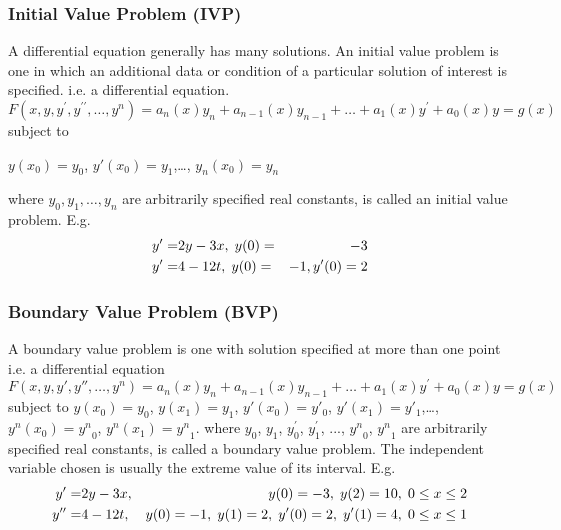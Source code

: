 \documentclass[12pt]{report}
\begin{document}
\subsubsection{Initial Value Problem (IVP)}
A differential equation generally has many solutions. An initial value problem is one in which an additional data or condition of a particular solution of interest is specified. i.e. a differential equation.
\begin{equation}
F(x,y,y^\prime,y^{\prime\prime},\dots,y^n ) = a_n(x)y_n + a_{n-1}(x)y_{n-1} + \dots + a_1(x)y^\prime + a_0(x)y = g(x)  
\end{equation}
subject to
\begin{center}
	$y(x_0) = y_0$, $y'(x_0) = y_1$,…, $y_n(x_0) = y_n$
\end{center}
where $y_0, y_1, \dots , y_n$ are arbitrarily specified real constants, is called an initial value problem. E.g.
\begin{eqnarray}
y' =& 2y - 3x,\hspace{1mm} y(0) =& -3\\
y'=& 4 - 12t,\hspace{1mm} y(0) =& -1, y'(0) = 2
\end{eqnarray}
\subsubsection{Boundary Value Problem (BVP)}
A boundary value problem is one with solution specified at more than one point i.e. a differential equation\\
\begin{equation}
F(x,y,y',y'',\dots,y^n ) = a_n(x)y_n + a_{n-1}(x)y_{n-1} +\dots+ a_1(x)y^\prime + a_0(x)y = g(x)
\end{equation}  subject to
$y(x_0) = y_0$, $y(x_1) = y_1$, $y'(x_0) = y'_0$, $y'(x_1) = y'_1$,…, $y^n(x_0) = {y^n}_0$, $y^n(x_1) = {y^n}_1$. 
where $y_0$, $y_1$, $y^\prime_0$, $y^\prime_1$, ..., ${y^n}_0$, ${y^n}_1$ are arbitrarily specified real constants, is called a boundary value problem. The independent variable chosen is usually the extreme value of its interval. E.g.
\begin{eqnarray}
y' =& 2y -3x,& y(0) = -3,\hspace{1mm} y(2) = 10,\hspace{1mm} 0\leq x\leq 2\\
y'' =& 4 - 12t,& y(0) = -1,\hspace{1mm} y(1) =2,\hspace{1mm} y'(0) = 2,\hspace{1mm} y'(1) = 4,\hspace{1mm} 0\leq x\leq 1
\end{eqnarray}
\end{document}

